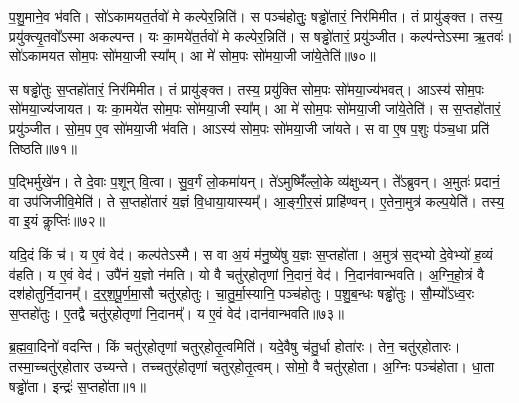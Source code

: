 प॒शु॒माने॒व भ॑वति।
सो॑ऽकामयत॒र्तवो॑ मे कल्पेर॒न्निति॑।
स पञ्च॑होतुः॒ षड्ढो॑तारं॒ निर॑मिमीत।
तं प्रायु॑ङ्क्त।
तस्य॒ प्रयु॑क्त्यृ॒तवो᳚\-ऽस्मा अकल्पन्त।
यः का॒मये॑त॒र्तवो॑ मे कल्पेर॒न्निति॑।
स षड्ढो॑तारं॒ प्रयु॑ञ्जीत।
कल्प॑न्ते\-ऽस्मा ऋ॒तवः॑।
सो॑ऽकामयत सोम॒पः सो॑मया॒जी स्या᳚म्।
आ मे॑ सोम॒पः सो॑मया॒जी जा॑ये॒तेति॑॥७०॥\ip

स षड्ढो॑तुः स॒प्तहो॑तारं॒ निर॑मिमीत।
तं प्रायु॑ङ्क्त।
तस्य॒ प्रयु॑क्ति सोम॒पः सो॑मया॒ज्य॑भवत्।
आऽस्य॑ सोम॒पः सो॑मया॒ज्य॑जायत।
यः का॒मये॑त सोम॒पः सो॑मया॒जी स्या᳚म्।
आ मे॑ सोम॒पः सो॑मया॒जी जा॑ये॒तेति॑।
स स॒प्तहो॑तारं॒ प्रयु॑ञ्जीत।
सो॒म॒प ए॒व सो॑मया॒जी भ॑वति।
आऽस्य॑ सोम॒पः सो॑मया॒जी जा॑यते।
स वा ए॒ष प॒शुः प॑ञ्च॒धा प्रति॑ तिष्ठति॥७१॥\ip

प॒द्भिर्मुखे॑न।
ते दे॒वाः प॒शून् वि॒त्वा।
सु॒व॒र्गं लो॒कमा॑यन्।
ते॑ऽमुष्मिँ॑ल्लो॒के व्य॑क्षुध्यन्।
ते᳚ऽब्रुवन्।
अ॒मुतः॑ प्रदानं॒ वा उप॑जिजीवि॒मेति॑।
ते स॒प्तहो॑तारं य॒ज्ञं वि॒धाया॒यास्यम्᳚।
आ॒ङ्गी॒र॒सं प्राहि॑ण्वन्।
ए॒तेना॒मुत्र॑ कल्प॒येति॑।
तस्य॒ वा इ॒यं कॢप्तिः॑॥७२॥\ip

यदि॒दं किं च॑।
य ए॒वं वेद॑।
कल्प॑ते\-ऽस्मै।
स वा अ॒यं म॑नु॒ष्ये॑षु य॒ज्ञः स॒प्तहो॑ता।
अ॒मुत्र॑ स॒द्भ्यो दे॒वेभ्यो॑ ह॒व्यं व॑हति।
य ए॒वं वेद॑।
उपै॑नं य॒ज्ञो न॑मति।
यो वै चतु॑र्‌\mbox{}होतृणां नि॒दानं॒ वेद॑।
नि॒दान॑वान्भवति।
अ॒ग्नि॒हो॒त्रं वै दश॑होतुर्नि॒दानम्᳚।
द॒र्‌॒\mbox{}श॒पू॒र्ण॒मा॒सौ चतु॑र्‌\mbox{}होतुः।
चा॒तु॒र्मा॒स्यानि॒ पञ्च॑होतुः।
प॒शु॒ब॒न्धः षड्ढो॑तुः।
सौ॒म्यो᳚\-ऽध्व॒रः स॒प्तहो॑तुः।
ए॒तद्वै चतु॑र्‌\mbox{}होतृणां नि॒दानम्᳚।
य ए॒वं वेद॑।दान॑वान्भवति॥७३॥\ip\anuvakamend[अ॒मि॒मी॒त॒ तं प्रायु॑ङ्क्त॒ पञ्च॑होतारं॒ प्र यु॑ञ्जीत जाये॒तेति॑ तिष्ठति॒ कॢप्ति॒र्दश॑होतुर्नि॒दानꣳ॑ स॒प्त च॑]


\clearpage
{}
\setcounter{anuvakam}{0}

ब्र॒ह्म॒वा॒दिनो॑ वदन्ति।
किं चतु॑र्‌\mbox{}होतृणां चतुर्‌\mbox{}होतृ॒त्वमिति॑।
यदे॒वैषु च॑तु॒र्धा होता॑रः।
तेन॒ चतु॑र्‌\mbox{}होतारः।
तस्मा॒च्चतु॑र्‌\mbox{}होतार उच्यन्ते।
तच्चतुर्॑होतृणां चतुर्‌\mbox{}होतृ॒त्वम्।
सोमो॒ वै चतु॑र्‌\mbox{}होता।
अ॒ग्निः पञ्च॑होता।
धा॒ता षड्ढो॑ता।
इन्द्रः॑ स॒प्तहो॑ता॥१॥\ip

